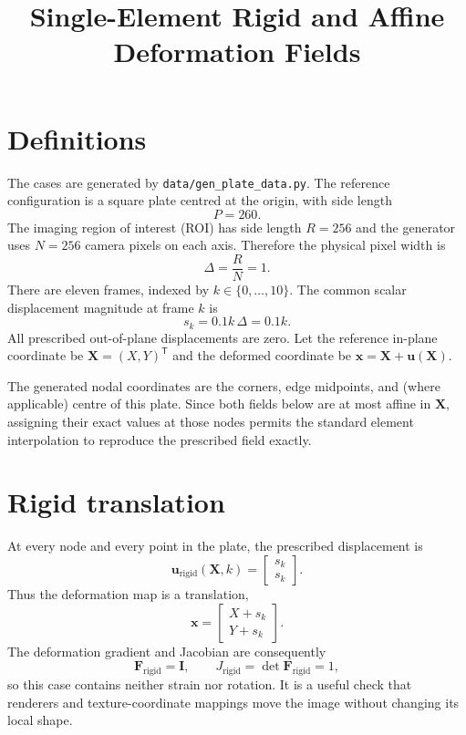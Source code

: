 \documentclass[11pt,a4paper]{article}
\title{Single-Element Rigid and Affine Deformation Fields}
\author{}
\date{}
\begin{document}
\maketitle

\section{Definitions}

The cases are generated by \texttt{data/gen\_plate\_data.py}.  The reference
configuration is a square plate centred at the origin, with side length
\begin{equation}
  P = 260.
\end{equation}
The imaging region of interest (ROI) has side length $R=256$ and the generator
uses $N=256$ camera pixels on each axis.  Therefore the physical pixel width is
\begin{equation}
  \Delta = \frac{R}{N} = 1.
\end{equation}
There are eleven frames, indexed by $k\in\{0,\ldots,10\}$.  The common scalar
displacement magnitude at frame $k$ is
\begin{equation}
  s_k = 0.1k\,\Delta = 0.1k.
\end{equation}
All prescribed out-of-plane displacements are zero.  Let the reference
in-plane coordinate be $\mathbf{X}=(X,Y)^\mathsf{T}$ and the deformed coordinate
be $\mathbf{x}=\mathbf{X}+\mathbf{u}(\mathbf{X})$.

The generated nodal coordinates are the corners, edge midpoints, and (where
applicable) centre of this plate.  Since both fields below are at most affine
in $\mathbf{X}$, assigning their exact values at those nodes permits the
standard element interpolation to reproduce the prescribed field exactly.

\section{Rigid translation}

At every node and every point in the plate, the prescribed displacement is
\begin{equation}
  \mathbf{u}_{\mathrm{rigid}}(\mathbf{X},k)
  = \begin{bmatrix}s_k\\s_k\end{bmatrix}.
\end{equation}
Thus the deformation map is a translation,
\begin{equation}
  \mathbf{x}
  = \begin{bmatrix}X+s_k\\Y+s_k\end{bmatrix}.
\end{equation}
The deformation gradient and Jacobian are consequently
\begin{equation}
  \mathbf{F}_{\mathrm{rigid}}=\mathbf{I},
  \qquad J_{\mathrm{rigid}}=\det\mathbf{F}_{\mathrm{rigid}}=1,
\end{equation}
so this case contains neither strain nor rotation.  It is a useful check that
renderers and texture-coordinate mappings move the image without changing its
local shape.
\end{document}

